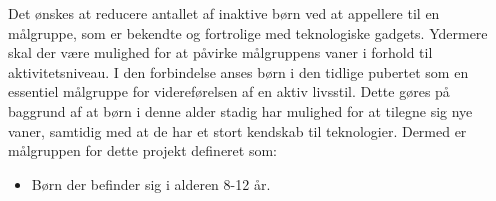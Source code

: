 Det ønskes at reducere antallet af inaktive børn ved at appellere til en målgruppe, som er bekendte og fortrolige med teknologiske gadgets. Ydermere skal der være mulighed for at påvirke målgruppens vaner i forhold til aktivitetsniveau. 
I den forbindelse anses børn i den tidlige pubertet som en essentiel målgruppe for videreførelsen af en aktiv livsstil. Dette gøres på baggrund af at børn i denne alder stadig har mulighed for at tilegne sig nye vaner, samtidig med at de har et stort kendskab til teknologier. 
Dermed er målgruppen for dette projekt defineret som: 
\begin{itemize}
\item Børn der befinder sig i alderen 8-12 år.
\end{itemize}